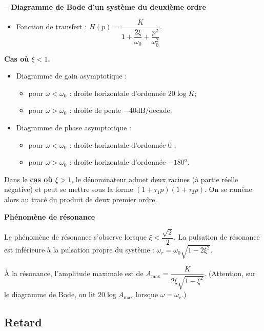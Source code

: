 \begin{resultat}\textbf{\textsf{\small -- Diagramme de Bode d'un système du deuxième ordre}} 
\begin{itemize}
\item Fonction de transfert : $H(p)=\dfrac{K}{1+\dfrac{2\xi}{\omega_0}+\dfrac{p^2}{\omega_0^2}}$.
\end{itemize}
\begin{center}
\textbf{Cas où $\xi<1$.}
\end{center}
\begin{itemize}
\item Diagramme de gain asymptotique : 
\begin{itemize}
\item pour $\omega<\omega_0$ : droite horizontale d'ordonnée $20 \log K$;
\item pour $\omega>\omega_0$ : droite de pente $-{40}\text{dB/decade}$.
\end{itemize}
\item Diagramme de phase asymptotique : 
\begin{itemize}
\item pour $\omega<\omega_0$ : droite horizontale d'ordonnée 0 \degre;
\item pour $\omega>\omega_0$ : droite horizontale d'ordonnée $-180^{\text{o}}$.
\end{itemize}
\end{itemize}


Dans le \textbf{cas où $\xi>1$}, le dénominateur admet deux racines (à partie réelle négative) et peut se mettre sous la forme  $\left(1+\tau_1 p \right)\left(1+\tau_2 p \right)$. On se ramène alors au tracé du produit de deux premier ordre.
\end{resultat}


\begin{resultat}
\textbf{Phénomène de résonance}

Le phénomène de résonance s'observe lorsque $\xi<\dfrac{\sqrt{2}}{2}$. La pulsation de résonance est inférieure à la pulsation propre du système :
$\omega_r = \omega_0\sqrt{1-2\xi^2}$.

\`A la résonance, l'amplitude maximale est de 
$A_{\text{max}} = \dfrac{K}{2\xi\sqrt{1-\xi^2}}.$
(Attention, sur le diagramme de Bode, on lit $20\log A_{\text{max}}$ lorsque $\omega=\omega_r$.)
\end{resultat}

\subsection{Retard}

